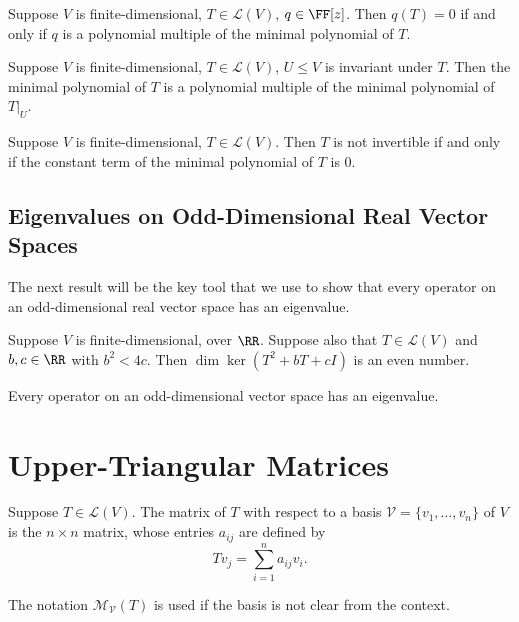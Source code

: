 \begin{proposition}
Suppose $V$ is finite-dimensional, $T\in\mathcal{L}(V)$, $q\in\FF[z]$. Then $q(T)=0$ if and only if $q$ is a polynomial multiple of the minimal polynomial of $T$.
\end{proposition}

\begin{proposition}
Suppose $V$ is finite-dimensional, $T\in\mathcal{L}(V)$, $U\le V$ is invariant under $T$. Then the minimal polynomial of $T$ is a polynomial multiple of the minimal polynomial of $T|_U$.
\end{proposition}

\begin{corollary}
Suppose $V$ is finite-dimensional, $T\in\mathcal{L}(V)$. Then $T$ is not invertible if and only if the constant term of the minimal polynomial of $T$ is $0$.
\end{corollary}

\subsection{Eigenvalues on Odd-Dimensional Real Vector Spaces}
The next result will be the key tool that we use to show that every operator on an odd-dimensional real vector space has an eigenvalue.

\begin{proposition}
Suppose $V$ is finite-dimensional, over $\RR$. Suppose also that $T\in\mathcal{L}(V)$ and $b,c\in\RR$ with $b^2<4c$. Then $\dim\ker(T^2+bT+cI)$ is an even number.
\end{proposition}

\begin{proposition}
Every operator on an odd-dimensional vector space has an eigenvalue.
\end{proposition}
\pagebreak

\section{Upper-Triangular Matrices}
\begin{definition}
Suppose $T\in\mathcal{L}(V)$. The matrix of $T$ with respect to a basis $\mathcal{V}=\{v_1,\dots,v_n\}$ of $V$ is the $n\times n$ matrix, whose entries $a_{ij}$ are defined by
\[Tv_j=\sum_{i=1}^{n}a_{ij}v_i.\]
\end{definition}

\begin{notation}
The notation $\mathcal{M}_\mathcal{V}(T)$ is used if the basis is not clear from the context.
\end{notation}

